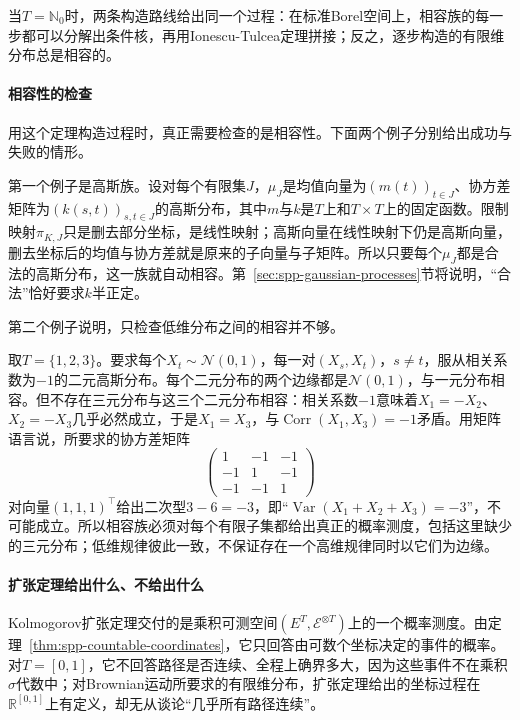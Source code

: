 当$T=\mathbb N_0$时，两条构造路线给出同一个过程：在标准Borel空间上，相容族的每一步都可以分解出条件核，再用Ionescu-Tulcea定理拼接；反之，逐步构造的有限维分布总是相容的。

\paragraph{相容性的检查}
用这个定理构造过程时，真正需要检查的是相容性。下面两个例子分别给出成功与失败的情形。

第一个例子是高斯族。设对每个有限集$J$，$\mu_J$是均值向量为$(m(t))_{t\in J}$、协方差矩阵为$(k(s,t))_{s,t\in J}$的高斯分布，其中$m$与$k$是$T$上和$T\times T$上的固定函数。限制映射$\pi_{K,J}$只是删去部分坐标，是线性映射；高斯向量在线性映射下仍是高斯向量，删去坐标后的均值与协方差就是原来的子向量与子矩阵。所以只要每个$\mu_J$都是合法的高斯分布，这一族就自动相容。第~\ref{sec:spp-gaussian-processes}节将说明，“合法”恰好要求$k$半正定。

第二个例子说明，只检查低维分布之间的相容并不够。

\begin{example}[两两相容却不存在的三元规律]
\label{ex:spp-inconsistent-pairs}
取$T=\{1,2,3\}$。要求每个$X_t\sim\mathcal N(0,1)$，每一对$(X_s,X_t)$，$s\ne t$，服从相关系数为$-1$的二元高斯分布。每个二元分布的两个边缘都是$\mathcal N(0,1)$，与一元分布相容。但不存在三元分布与这三个二元分布相容：相关系数$-1$意味着$X_1=-X_2$、$X_2=-X_3$几乎必然成立，于是$X_1=X_3$，与$\operatorname{Corr}(X_1,X_3)=-1$矛盾。用矩阵语言说，所要求的协方差矩阵
\[
  \begin{pmatrix}1&-1&-1\\-1&1&-1\\-1&-1&1\end{pmatrix}
\]
对向量$(1,1,1)^\top$给出二次型$3-6=-3$，即“$\operatorname{Var}(X_1+X_2+X_3)=-3$”，不可能成立。所以相容族必须对每个有限子集都给出真正的概率测度，包括这里缺少的三元分布；低维规律彼此一致，不保证存在一个高维规律同时以它们为边缘。
\end{example}

\paragraph{扩张定理给出什么、不给出什么}
Kolmogorov扩张定理交付的是乘积可测空间$(E^T,\mathcal E^{\otimes T})$上的一个概率测度。由定理~\ref{thm:spp-countable-coordinates}，它只回答由可数个坐标决定的事件的概率。对$T=[0,1]$，它不回答路径是否连续、全程上确界多大，因为这些事件不在乘积$\sigma$代数中；对Brownian运动所要求的有限维分布，扩张定理给出的坐标过程在$\mathbb R^{[0,1]}$上有定义，却无从谈论“几乎所有路径连续”。

